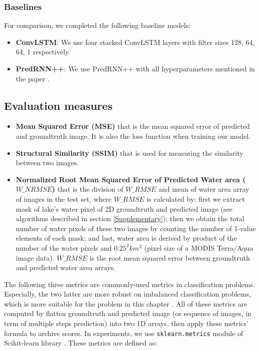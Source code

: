 \subsubsection{Baselines}
For comparison, we completed the following baseline models:
\begin{itemize}
    \item \textbf{ConvLSTM}: We use four stacked ConvLSTM layers with filter sizes 128, 64, 64, 1 respectively.
    \item \textbf{PredRNN++}: We use PredRNN++ with all hyperparameters mentioned in the paper \cite{wang2018predrnn}.
\end{itemize}

\subsection{Evaluation measures}
\begin{itemize}
    \item \textbf{Mean Squared Error (MSE)} that is the mean squared error of predicted and groundtruth image. It is also the loss function when training our model.
    \item \textbf{Structural Similarity (SSIM)} \cite{Wang:2004:IQA:2319031.2320551} that is used for measuring the similarity between two images.
    \item \textbf{Normalized Root Mean Squared Error of Predicted Water area ($W\_NRMSE$)} that is the division of $W\_RMSE$ and mean of water area array of images in the test set, where $W\_RMSE$ is calculated by: first we extract mask of lake's water pixel of 2D groundtruth and predicted image (see algorithms described in section \ref{Supplementary}); then we obtain the total number of water pixels of these two images by counting the number of 1-value elements of each mask; and last, water area is derived by product of the number of the water pixels and $0.25^2 km^2$ (pixel size of a MODIS Terra/Aqua image data). $W\_RMSE$ is the root mean squared error between groundtruth and predicted water area arrays.
\end{itemize}
The following three metrics are commonly-used metrics in classification problems. Especially, the two latter are more robust on imbalanced classification problems, which is more suitable for the problem in this chapter .
All of these metrics are computed by flatten groundtruth and predicted image (or sequence of images, in term of multiple steps prediction) into two 1D arrays, then apply these metrics' formula to archive scores. In experiments, we use \texttt{sklearn.metrics} module of Scikit-learn library \cite{scikit-learn}. These metrics are defined as:
